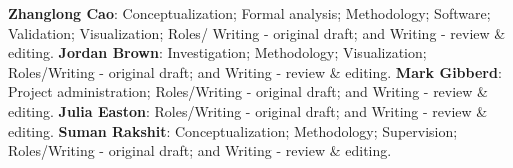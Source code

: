 \documentclass[a4paper]{article} 	%
\begin{document}
\textbf{Zhanglong Cao}: Conceptualization; Formal analysis; Methodology; Software; Validation; Visualization; Roles/ Writing - original draft; and Writing - review \& editing. \textbf{Jordan Brown}: Investigation; Methodology; Visualization; Roles/Writing - original draft; and Writing - review \& editing. \textbf{Mark Gibberd}: Project administration; Roles/Writing - original draft; and Writing - review \& editing. \textbf{Julia Easton}: Roles/Writing - original draft; and Writing - review \& editing. \textbf{Suman Rakshit}: Conceptualization; Methodology; Supervision; Roles/Writing - original draft; and Writing - review \& editing. 


\renewcommand\bibname{References}%
\printbibliography
\end{document}
